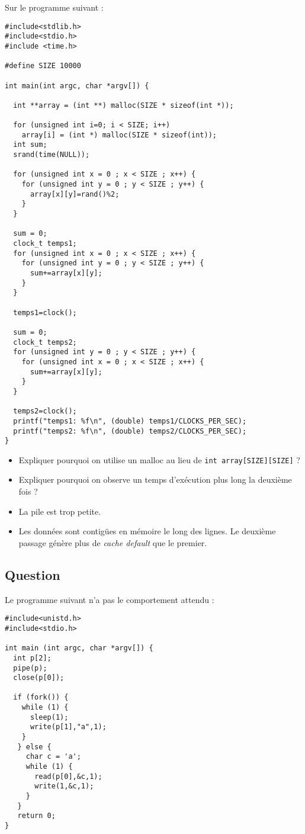 \documentclass[11pt]{article}
\newcounter{questionc}
\newcommand{\question}{\stepcounter{questionc}\subsection{Question \thequestionc}}
\begin{document}
Sur le programme suivant :
\begin{verbatim}
#include<stdlib.h>
#include<stdio.h>
#include <time.h>

#define SIZE 10000

int main(int argc, char *argv[]) {

  int **array = (int **) malloc(SIZE * sizeof(int *));

  for (unsigned int i=0; i < SIZE; i++)
    array[i] = (int *) malloc(SIZE * sizeof(int));
  int sum;
  srand(time(NULL));

  for (unsigned int x = 0 ; x < SIZE ; x++) {
    for (unsigned int y = 0 ; y < SIZE ; y++) {
      array[x][y]=rand()%2;
    }
  }

  sum = 0;
  clock_t temps1;
  for (unsigned int x = 0 ; x < SIZE ; x++) {
    for (unsigned int y = 0 ; y < SIZE ; y++) {
      sum+=array[x][y];
    }
  }

  temps1=clock();

  sum = 0;
  clock_t temps2;
  for (unsigned int y = 0 ; y < SIZE ; y++) {
    for (unsigned int x = 0 ; x < SIZE ; x++) {
      sum+=array[x][y];
    }
  }

  temps2=clock();
  printf("temps1: %f\n", (double) temps1/CLOCKS_PER_SEC);
  printf("temps2: %f\n", (double) temps2/CLOCKS_PER_SEC);
}
\end{verbatim}

\begin{itemize}
\item Expliquer pourquoi on utilise un malloc au lieu de \texttt{int array[SIZE][SIZE]} ?
\item Expliquer pourquoi on observe un temps d'exécution plus long la deuxième fois ?
\end{itemize}

\begin{solution}
  \begin{itemize}
  \item La pile est trop petite.
  \item Les données sont contigües en mémoire le long des lignes. Le deuxième passage génère plus de \textit{cache default} que le premier.
  \end{itemize}
\end{solution}

\question

Le programme suivant n'a pas le comportement attendu :
\begin{verbatim}
#include<unistd.h>
#include<stdio.h>

int main (int argc, char *argv[]) {
  int p[2];
  pipe(p);
  close(p[0]);

  if (fork()) {
    while (1) {
      sleep(1);
      write(p[1],"a",1);
    }
   } else {
     char c = 'a';
     while (1) {
       read(p[0],&c,1);
       write(1,&c,1);
     }
   }
   return 0;
}
\end{verbatim}
\end{document}
